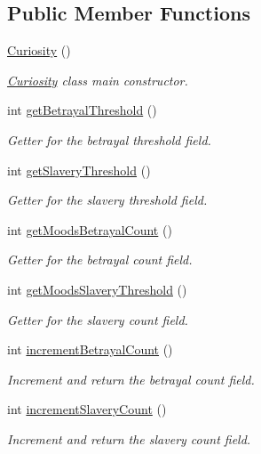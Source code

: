 \subsection*{Public Member Functions}
\begin{DoxyCompactItemize}
\item 
\hyperlink{a00007_ace7848af7947b88a4b43859a9e00704b}{Curiosity} ()
\begin{DoxyCompactList}\small\item\em \hyperlink{a00007}{Curiosity} class main constructor. \end{DoxyCompactList}\item 
int \hyperlink{a00015_a766902de5008b4ff54729075fe0b66a6}{get\-Betrayal\-Threshold} ()
\begin{DoxyCompactList}\small\item\em Getter for the betrayal threshold field. \end{DoxyCompactList}\item 
int \hyperlink{a00015_a8c5dda351cf131a2e2a30a1570e2c7e7}{get\-Slavery\-Threshold} ()
\begin{DoxyCompactList}\small\item\em Getter for the slavery threshold field. \end{DoxyCompactList}\item 
int \hyperlink{a00015_aae8ae123bc9d3bae48e08ad15528aa5b}{get\-Moods\-Betrayal\-Count} ()
\begin{DoxyCompactList}\small\item\em Getter for the betrayal count field. \end{DoxyCompactList}\item 
int \hyperlink{a00015_a859eb2f9bae00ce3604d0fea5a690900}{get\-Moods\-Slavery\-Threshold} ()
\begin{DoxyCompactList}\small\item\em Getter for the slavery count field. \end{DoxyCompactList}\item 
int \hyperlink{a00015_a322adb08d4a6f7dcd0eb00c77649d2d2}{increment\-Betrayal\-Count} ()
\begin{DoxyCompactList}\small\item\em Increment and return the betrayal count field. \end{DoxyCompactList}\item 
int \hyperlink{a00015_ac416312a82ad5afce4090858b47b0c96}{increment\-Slavery\-Count} ()
\begin{DoxyCompactList}\small\item\em Increment and return the slavery count field. \end{DoxyCompactList}\item 

\end{DoxyCompactItemize}
